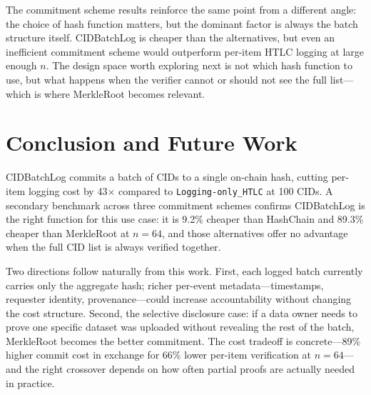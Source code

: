 \documentclass{svproc}
\def\ours{\xspace{CIDBatchLog}\xspace}
\begin{document}
The commitment scheme results reinforce the same point from a different angle: the choice of hash function matters, but the dominant factor is always the batch structure itself. CIDBatchLog is cheaper than the alternatives, but even an inefficient commitment scheme would outperform per-item HTLC logging at large enough $n$. The design space worth exploring next is not which hash function to use, but what happens when the verifier cannot or should not see the full list---which is where MerkleRoot becomes relevant.



\section{Conclusion and Future Work}\label{sec:conclusion}
\ours commits a batch of CIDs to a single on-chain hash, cutting per-item logging cost by 43$\times$ compared to \texttt{Logging-only\_HTLC} at 100 CIDs. A secondary benchmark across three commitment schemes confirms CIDBatchLog is the right function for this use case: it is 9.2\% cheaper than HashChain and 89.3\% cheaper than MerkleRoot at $n=64$, and those alternatives offer no advantage when the full CID list is always verified together.

Two directions follow naturally from this work. First, each logged batch currently carries only the aggregate hash; richer per-event metadata---timestamps, requester identity, provenance---could increase accountability without changing the cost structure. Second, the selective disclosure case: if a data owner needs to prove one specific dataset was uploaded without revealing the rest of the batch, MerkleRoot becomes the better commitment. The cost tradeoff is concrete---89\% higher commit cost in exchange for 66\% lower per-item verification at $n=64$---and the right crossover depends on how often partial proofs are actually needed in practice.









\end{document}
